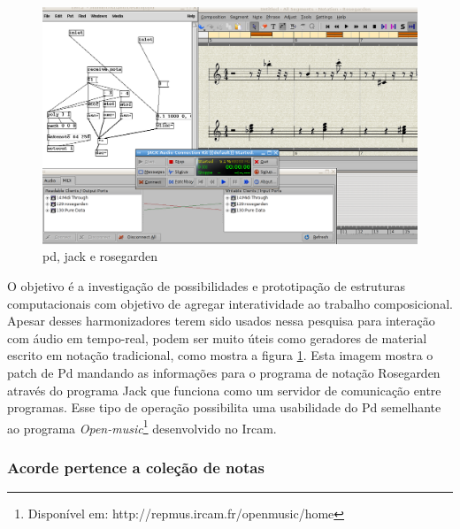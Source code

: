 \documentclass{ppgmus}
\begin{document}


\begin{figure}
\includegraphics[scale=.4]{harm5}
\caption{pd, jack e rosegarden}
\label{harm5}
\end{figure}

O objetivo é a investigação de possibilidades e prototipação de estruturas computacionais com 
objetivo de agregar interatividade ao trabalho composicional.  
	Apesar desses harmonizadores terem sido usados nessa pesquisa para interação com áudio em 
tempo-real, podem ser muito úteis como geradores de material escrito em notação tradicional, 
como mostra a figura \ref{harm5}. Esta imagem mostra o patch de Pd mandando as informações para o programa 
de notação Rosegarden através do programa Jack que funciona como um servidor de comunicação entre 
programas. Esse tipo de operação possibilita uma usabilidade do Pd semelhante ao programa \textit{Open-music}\footnote{Disponível em:
http://repmus.ircam.fr/openmusic/home}
desenvolvido no Ircam.


\subsubsection{Acorde pertence a coleção de notas}
\end{document}
